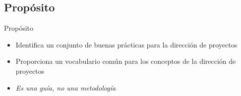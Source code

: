 \subsection{Propósito}
\begin{frame}{Propósito}
	
	\begin{itemize}
		\item{Identifica un conjunto de buenas prácticas para la dirección de proyectos}
		\item{Proporciona un vocabulario común para los conceptos de la dirección de proyectos}
		\item{\emph{Es una guía, no una metodología}}
	\end{itemize}
\end{frame}

